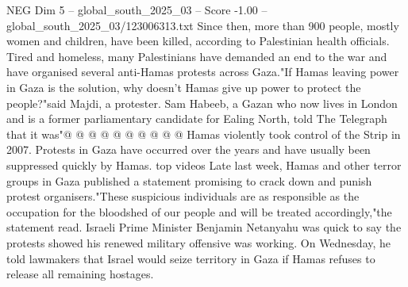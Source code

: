 \begin{textsample}{NEG Dim 5 – global\_south\_2025\_03 – Score -1.00 – global\_south\_2025\_03/123006313.txt}
Since then, more than 900 people, mostly women and children, have been killed, according to Palestinian health officials.
Tired and homeless, many Palestinians have demanded an end to the war and have organised several anti-Hamas protests across Gaza."If Hamas leaving power in Gaza is the solution, why doesn't Hamas give up power to protect the people?"said Majdi, a protester.
Sam Habeeb, a Gazan who now lives in London and is a former parliamentary candidate for Ealing North, told The Telegraph that it was"@ @ @ @ @ @ @ @ @ @ Hamas violently took control of the Strip in 2007.
Protests in Gaza have occurred over the years and have usually been suppressed quickly by Hamas. top videos Late last week, Hamas and other terror groups in Gaza published a statement promising to crack down and punish protest organisers."These suspicious individuals are as responsible as the occupation for the bloodshed of our people and will be treated accordingly,"the statement read.
Israeli Prime Minister Benjamin Netanyahu was quick to say the protests showed his renewed military offensive was working.
On Wednesday, he told lawmakers that Israel would seize territory in Gaza if Hamas refuses to release all remaining hostages.

\end{textsample}
